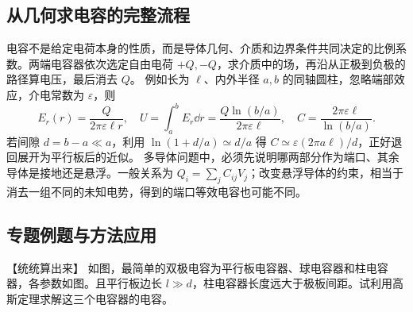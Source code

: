 {\subsection{从几何求电容的完整流程}
电容不是给定电荷本身的性质，而是导体几何、介质和边界条件共同决定的比例系数。两端电容器依次选定自由电荷 $+Q,-Q$，求介质中的场，再沿从正极到负极的路径算电压，最后消去 $Q$。
例如长为 $\ell$、内外半径 $a,b$ 的同轴圆柱，忽略端部效应，介电常数为 $\varepsilon$，则
\[
 E_r(r)=\frac{Q}{2\pi\varepsilon\ell r},\quad
 U=\int_a^b E_r\dd r=\frac{Q\ln(b/a)}{2\pi\varepsilon\ell},\quad
 C=\frac{2\pi\varepsilon\ell}{\ln(b/a)}.
\]
若间隙 $d=b-a\ll a$，利用 $\ln(1+d/a)\simeq d/a$ 得
$C\simeq\varepsilon(2\pi a\ell)/d$，正好退回展开为平行板后的近似。
多导体问题中，必须先说明哪两部分作为端口、其余导体是接地还是悬浮。一般关系为 $Q_i=\sum_j C_{ij}V_j$；改变悬浮导体的约束，相当于消去一组不同的未知电势，得到的端口等效电容也可能不同。


\subsection{专题例题与方法应用}

\begin{origexamplebox}{【统统算出来】}\label{ch20:ex:s35-4-1}
如图，最简单的双极电容为平行板电容器、球电容器和柱电容器，各参数如图。且平行板边长
$l\gg d$，柱电容器长度远大于极板间距。试利用高斯定理求解这三个电容器的电容。
\begin{center}
\begin{minipage}{.53\linewidth}\emParallelQuestion\end{minipage}
\begin{minipage}{.40\linewidth}\emSphericalQuestion\end{minipage}
\end{center}
\label{ch20:fig:em-capacitors-question}
\begin{center}\end{center}
\label{ch20:fig:em-source-thirty-fifth-section-1}
\end{origexamplebox}\par\nopagebreak[4]

}
